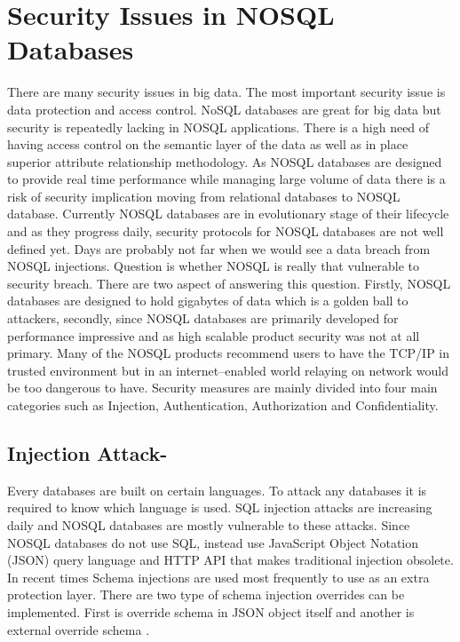 \documentclass[sigconf]{acmart}
\begin{document}
\section{Security Issues in NOSQL Databases }
There are many security issues in big data. The most important security issue is data protection and access control\cite{editor02}. NoSQL databases are great for big data but security is repeatedly lacking in NOSQL applications. There is a high need of having access control on the semantic layer of the data as well as in place superior attribute relationship methodology. As NOSQL databases are designed to provide real time performance while managing large volume of data there is a risk of security implication moving from relational databases to NOSQL database. Currently NOSQL databases are in evolutionary stage of their lifecycle and as they progress daily, security protocols for NOSQL databases are not well defined yet. Days are probably not far when we would see a data breach from NOSQL injections\cite{editor02}.  Question is whether NOSQL is really that vulnerable to security breach. There are two aspect of answering this question. Firstly, NOSQL databases are designed to hold gigabytes of data which is a golden ball to attackers, secondly, since NOSQL databases are primarily developed for performance impressive and as high scalable product security was not at all primary. Many of the NOSQL products recommend users to have the TCP/IP in trusted environment but in an internet–enabled world relaying on network would be too dangerous to have. Security measures are mainly divided into four main categories such as Injection, Authentication, Authorization and Confidentiality.


\subsection{Injection Attack-} Every databases are built on certain languages. To attack any databases it is required to know which language is used. SQL injection attacks are increasing daily and NOSQL databases are mostly vulnerable to these attacks. Since NOSQL databases do not use SQL, instead use JavaScript Object Notation (JSON) query language and HTTP API that makes traditional injection obsolete. In recent times Schema injections are used most frequently to use as an extra protection layer. There are two type of schema injection overrides can be implemented. First is override schema in JSON object itself and another is external override schema \cite{editor03}.
\end{document}
